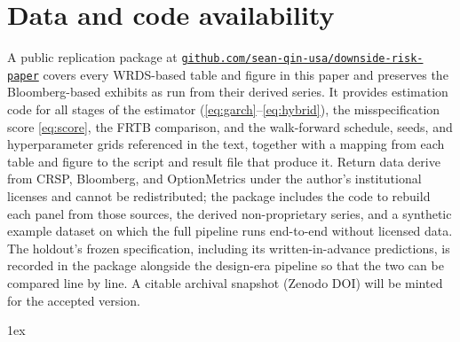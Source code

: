 \documentclass[11pt]{article}
\theoremstyle{remark}
\begin{document}
\section*{Data and code availability}
A public replication package at
\href{https://github.com/sean-qin-usa/downside-risk-paper}{\texttt{github.com/sean-qin-usa/downside-risk-paper}}
covers every WRDS-based table and figure in this paper and preserves
the Bloomberg-based exhibits as run from their derived series. It
provides estimation code for all stages of the estimator
(\eqref{eq:garch}--\eqref{eq:hybrid}), the misspecification score
\eqref{eq:score}, the FRTB comparison, and the walk-forward schedule, seeds, and hyperparameter grids
referenced in the text, together with a mapping from each table and
figure to the script and result file that produce it. Return data
derive from CRSP, Bloomberg, and OptionMetrics under the author's
institutional licenses and cannot be redistributed; the package
includes the code to rebuild each panel from those sources, the derived
non-proprietary series, and a synthetic example dataset on which the
full pipeline runs end-to-end without licensed data. The holdout's
frozen specification, including its written-in-advance predictions, is
recorded in the package alongside the design-era pipeline so that the
two can be compared line by line. A citable archival snapshot (Zenodo
DOI) will be minted for the accepted version.

\begingroup
\parindent 0pt\parskip 1ex
\renewcommand{\enotesize}{\normalsize}
\theendnotes
\endgroup




\end{document}
